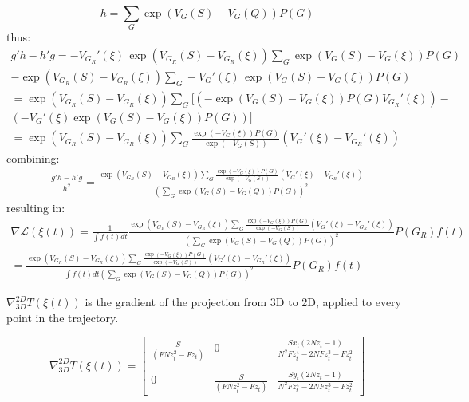 \documentclass[a4paper,11pt,times,doublespace]{article}
\begin{document}
\begin{equation*}
	h = \sum_G \exp(V_G(S) - V_G(Q))P(G)
\end{equation*} 
thus:
\begin{multline*}
	g'h - h'g = - V_{G_R}'(\xi)\,\exp(V_{G_R}(S) - V_{G_R}(\xi)) \sum_G \exp(V_G(S) - V_G(\xi))P(G)\\
	 - \exp(V_{G_R}(S) - V_{G_R}(\xi)) \sum_G - V_G'(\xi) \, \exp(V_G(S) - V_G(\xi))P(G)\\
	 = \exp(V_{G_R}(S) - V_{G_R}(\xi)) \sum_G \Big[ (-\exp(V_G(S)-V_G(\xi)) P(G) V_{G_R}'(\xi)) - \\(-V_G'(\xi)\exp(V_G(S)-V_G(\xi))P(G))\Big]\\
	 = \exp(V_{G_R}(S) - V_{G_R}(\xi)) \sum_G \frac{\exp(-V_G(\xi))P(G)}{\exp(-V_G(S))}(V_G'(\xi) - V_{G_R}'(\xi)) \qquad \qquad
\end{multline*}
combining:
\begin{multline*}
	\frac{g'h - h'g}{h^2} = \frac{\exp(V_{G_R}(S) - V_{G_R}(\xi)) \sum_G \frac{\exp(-V_G(\xi))P(G)}{\exp(-V_G(S))}(V_G'(\xi) - V_{G_R}'(\xi))}{(\sum_G \exp(V_G(S) - V_G(Q))P(G))^2}
\end{multline*}
resulting in:
\begin{multline*}
	\nabla \mathcal{L}(\xi(t)) = \frac{1}{\int f(t) dt} \frac{\exp(V_{G_R}(S) - V_{G_R}(\xi)) \sum_G \frac{\exp(-V_G(\xi))P(G)}{\exp(-V_G(S))}(V_G'(\xi) - V_{G_R}'(\xi))}{(\sum_G \exp(V_G(S) - V_G(Q))P(G))^2} P(G_R) f(t) \\
	= \frac{\exp(V_{G_R}(S) - V_{G_R}(\xi)) \sum_G \frac{\exp(-V_G(\xi))P(G)}{\exp(-V_G(S))}(V_G'(\xi) - V_{G_R}'(\xi))}{\int f(t)dt (\sum_G \exp(V_G(S) - V_G(Q))P(G))^2} P(G_R) f(t) 
\end{multline*}


$\nabla_{3D}^{2D} T(\xi(t))$ is the gradient of the projection from 3D to 2D, applied to every point in the trajectory.

\begin{equation*}
	\nabla_{3D}^{2D} T(\xi(t)) = \begin{bmatrix}
		\frac{S}{(F N z_t^2 - F z_t)} & 0 & \frac{S x_t (2 N z_t - 1)}{N^2 F z_t^4 - 2 N F z_t^3 - F z_t^2}\\\\
		0 & \frac{S}{(F N z_t^2 - F z_t)} & \frac{S y_t (2 N z_t - 1)}{N^2 F z_t^4 - 2 N F z_t^3 - F z_t^2}
	\end{bmatrix}
\end{equation*}
\end{document}
